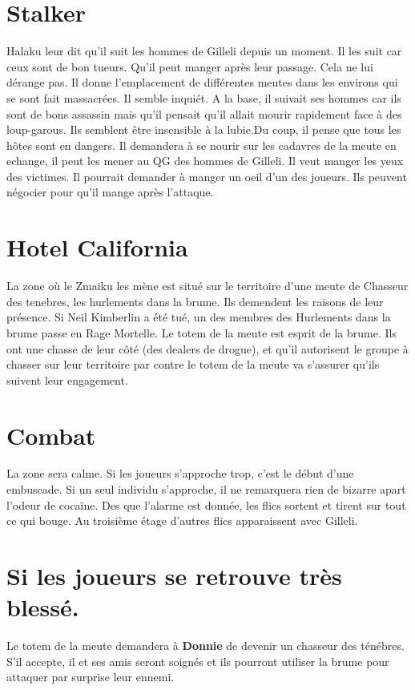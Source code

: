 \documentclass[oneside,12pt]{book}
\begin{document}
\begin{flushleft}
\section{Stalker}
Halaku leur dit qu'il suit les hommes de Gilleli depuis un moment. Il les suit car ceux sont de bon tueurs. Qu'il peut manger après leur passage. Cela ne lui dérange pas. Il donne 
l'emplacement de différentes meutes dans les environs qui se sont fait massacrées. Il semble inquiét. A la base, il suivait ses hommes car ils sont de bons assassin mais qu'il pensait qu'il 
allait mourir rapidement face à des loup-garous. Ils semblent être insensible à la lubie.Du coup, il pense que tous les hôtes sont en dangers. Il demandera à se nourir sur les cadavres de la 
meute en echange, il peut les mener au QG des hommes de Gilleli. Il veut manger les yeux des victimes. Il pourrait demander à manger un oeil d'un des joueurs. 
Ils peuvent  négocier pour qu'il mange après l'attaque. 



\section{Hotel California} 
La zone où le Zmaiku les mène est situé sur le territoire d'une meute de Chasseur des tenebres, les hurlements dans la brume. 
Ils demendent les raisons de leur présence. Si  Neil Kimberlin a été tué, un des membres des Hurlements dans la brume passe en Rage Mortelle. 
Le totem de la meute est esprit de la brume. Ils ont une chasse de leur côté (des dealers de drogue), et qu'il autorisent le groupe à chasser sur leur territoire par contre le totem de la meute va s'assurer qu'ils suivent leur engagement. 

\section{Combat}
La zone sera calme. Si les joueurs s'approche trop, c'est le début d'une embuscade. Si un seul individu s'approche, il ne remarquera rien de bizarre apart l'odeur de cocaïne. 
Des que l'alarme est donnée, les flics sortent et tirent sur tout ce qui bouge. Au troisième étage d'autres flics apparaissent avec Gilleli.

\section{Si les joueurs se retrouve très blessé.}
Le totem de la meute demandera à \textbf{Donnie} de devenir un chasseur des ténébres. 
S'il accepte, il et ses amis seront soignés et ils pourront utiliser la brume pour attaquer par surprise leur 
ennemi. 


\end{flushleft}
\end{document}
